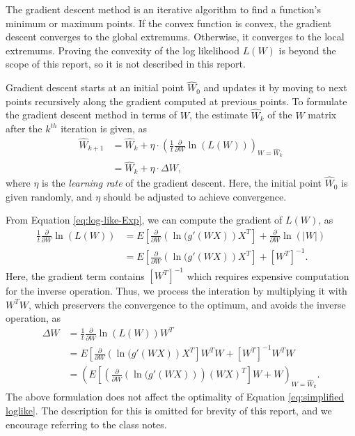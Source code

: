 \documentclass[conference]{IEEEtran}
\begin{document}
The gradient descent method is an iterative algorithm to find a function's minimum or maximum points. If the convex function is convex, the gradient descent converges to the global extremums. Otherwise, it converges to the local extremums. Proving the convexity of the log likelihood $L(W)$ is beyond the scope of this report, so it is not described in this report.

Gradient descent starts at an initial point $\hat{W}_0$ and updates it by moving to next points recursively along the gradient computed at previous points. To formulate the gradient descent method in terms of $W$, the estimate $\hat{W}_{k}$ of the $W$ matrix after the $k^{th}$ iteration is given, as 
\begin{equation}
\begin{aligned}
    \hat{W}_{k+1} &= \hat{W}_k + \eta\cdot\left(\frac{1}{t}\frac{\partial}{\partial W}\ln(L(W))\right)_{W=\hat{W}_k}\\
     &= \hat{W}_k + \eta\cdot\Delta W,
\end{aligned}
\end{equation}
where $\eta$ is the {\it learning rate} of the gradient descent.
Here, the initial point $\hat{W}_0$ is given randomly, and $\eta$ should be adjusted to achieve convergence.

From Equation \ref{eq:log-like-Exp}, we can compute the gradient of $L(W)$, as
\begin{equation}
\begin{aligned}
    \frac{1}{t}\frac{\partial}{\partial W}\ln(L(W)) 
    &= E\left[\frac{\partial}{\partial W}(\ln{(g'(WX)})X^T\right] + \frac{\partial}{\partial W}\ln{(|W|)} \\
    &= E\left[\frac{\partial}{\partial W}(\ln{(g'(WX)})X^T\right] + \left[W^T\right]^{-1}.
\end{aligned}
\end{equation}
Here, the gradient term contains $\left[W^T\right]^{-1}$ which requires expensive computation for the inverse operation. 
Thus, we process the interation by multiplying it with $W^TW$, which preservers the convergence to the optimum, and avoids the inverse operation, as
\begin{equation}
\begin{aligned}
    \Delta W
    &= \frac{1}{t}\frac{\partial}{\partial W}\ln(L(W)) W^T \\
    &= E\left[\frac{\partial}{\partial W}(\ln{(g'(WX)})X^T\right] W^TW + \left[W^T\right]^{-1} W^TW \\
    &= \left(E\left[\left(\frac{\partial}{\partial W}(\ln{(g'(WX)})\right)(WX)^T\right] W + W\right)_{W=\hat{W}_k}.
    \label{eq:delta W simplified}
\end{aligned}
\end{equation}
The above formulation does not affect the optimality of Equation \ref{eq:simplified loglike}. The description for this is omitted for brevity of this report, and we encourage referring to the class notes.
\end{document}
